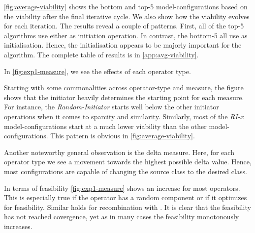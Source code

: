 \documentclass[./../../paper.tex]{subfiles}
\begin{document}
\autoref{fig:average-viability} shows the bottom and top-5 model-configurations based on the viability after the final iterative cycle. We also show how the viability evolves for each iteration. The results reveal a couple of patterns. 
First, all of the top-5 algorithms use either  as initiation operation. In contrast, the bottom-5 all use  as initialisation. Hence, the initialisation appears to be majorly important for the algorithm.
The complete table of results is in \autoref{app:avg-viability}.




In \autoref{fig:exp1-measure}, we see the effects of each operator type. 

Starting with some commonalities across operator-type and measure, the figure shows that the initiator heavily determines the starting point for each measure. For instance, the \emph{Random-Initiator} starts well below the other initiator operations when it comes to sparcity and similarity. Similarly, most of the \emph{RI-x} model-configurations start at a much lower viability than the other model-configurations. This pattern is obvious in \autoref{fig:average-viability}. 

Another noteworthy general observation is the delta measure. Here, for each operator type we see a movement towards the highest possible delta value. Hence, most configurations are capable of changing the source class to the desired class. 

In terms of feasibility \autoref{fig:exp1-measure} shows an increase for most operators. This is especially true if the operator has a random component or if it optimizes for feasibility. Similar holds for recombination with . It is clear that the feasibility has not reached covergence, yet as in many cases the feasibility monotonously increases.  
\end{document}

